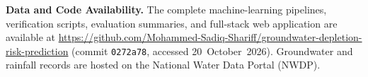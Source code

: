 \documentclass[conference]{IEEEtran}
\begin{document}

\textbf{Data and Code Availability.}
The complete machine-learning pipelines, verification scripts,
evaluation summaries, and full-stack web application are available
at \url{https://github.com/Mohammed-Sadiq-Shariff/groundwater-depletion-risk-prediction}
(commit \texttt{0272a78}, accessed 20~October~2026).
Groundwater and rainfall records are hosted on the National
Water Data Portal (NWDP).



\end{document}
